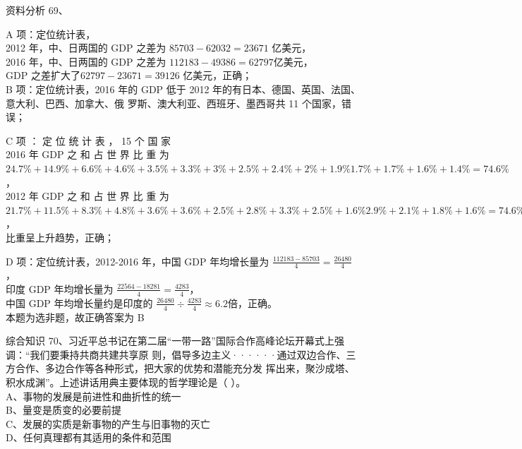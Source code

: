 \documentclass[aspectratio=169]{beamer}
\begin{document}
\begin{frame}[t]{资料分析}
    69、
    {\scriptsize
    A 项：定位统计表，\\
    2012 年，中、日两国的 GDP 之差为 $85703 - 62032 = 23671$ 亿美元，\\
    2016 年，中、日两国的 GDP 之差为 $112183 - 49386 = 62797$亿美元，\\
    GDP 之差扩大了$62797 - 23671 = 39126$ 亿美元，正确；\\

    B 项：定位统计表，2016 年的 GDP 低于 2012 年的有日本、德国、英国、法国、意大利、巴西、加拿大、俄
    罗斯、澳大利亚、西班牙、墨西哥共 11 个国家，错误；

    C 项 ： 定 位 统 计 表 ， 15 个 国 家\\
    2016 年 GDP 之 和 占 世 界 比 重 为 $24.7\% + 14.9\% + 6.6\% +4.6\% + 3.5\% + 3.3\% + 3\% + 2.5\% +2.4\% + 2\% + 1.9\% 1.7\% +1.7\% + 1.6\% + 1.4\% = 74.6\%$，\\
    2012 年 GDP 之 和 占 世 界 比 重 为 $21.7\% + 11.5\% + 8.3\% +4.8\% + 3.6\% + 3.6\% + 2.5\% + 2.8\% +3.3\% + 2.5\% + 1.6\% 2.9\% +2.1\% + 1.8\% + 1.6\% = 74.6\%$，\\

    比重呈上升趋势，正确；

    D 项：定位统计表，2012-2016 年，中国 GDP 年均增长量为 $\frac{112183 - 85703}{4}  = \frac{26480}{4}$，\\
    印度 GDP 年均增长量为 $\frac{22564 - 18281}{4}  = \frac{4283}{4}$，\\
    中国 GDP 年均增长量约是印度的 $\frac{26480}{4} \div \frac{4283}{4} \approx 6.2 $倍，正确。\\
    本题为选非题，故正确答案为 B
    }
\end{frame}                           





\begin{frame}[t]{综合知识}
    70、习近平总书记在第二届“一带一路”国际合作高峰论坛开幕式上强调：“我们要秉持共商共建共享原
    则，倡导多边主义······通过双边合作、三方合作、多边合作等各种形式，把大家的优势和潜能充分发
    挥出来，聚沙成塔、积水成渊”。上述讲话用典主要体现的哲学理论是（ ）。    \\
    A、事物的发展是前进性和曲折性的统一                                     \\
    B、量变是质变的必要前提                                                 \\
    C、发展的实质是新事物的产生与旧事物的灭亡                               \\
    D、任何真理都有其适用的条件和范围                                       \\
\end{frame}                           
\end{document}
